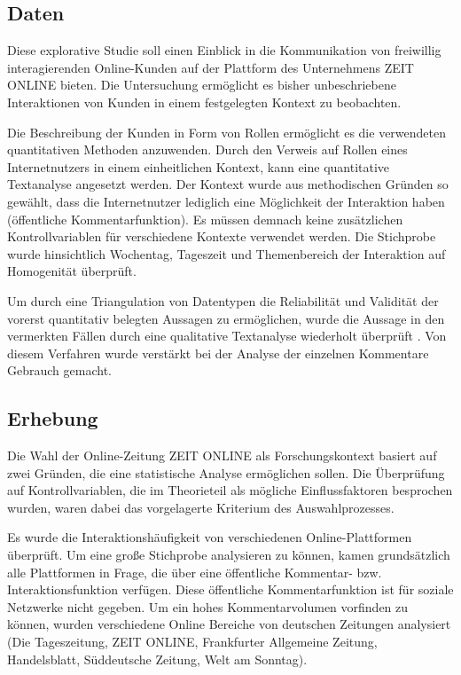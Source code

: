 \documentclass[12pt,a4paper,oneside]{article}
\begin{document}
\begin{titlepage}
\begin{flushleft}
\newpage
\section{Daten}
Diese explorative Studie soll einen Einblick in die Kommunikation von freiwillig interagierenden Online-Kunden auf der Plattform des Unternehmens ZEIT ONLINE bieten. Die Untersuchung ermöglicht es bisher unbe\-schriebene Interaktionen von Kunden in einem festgelegten Kontext zu beobachten.

Die Beschreibung der Kunden in Form von Rollen ermöglicht es die verwendeten quantitativen Methoden anzuwenden. Durch den Verweis auf Rollen eines Internetnutzers in einem einheitlichen Kontext, kann eine quantitative Textanalyse angesetzt werden. Der Kontext wurde aus methodischen Gründen so gewählt, dass die Internetnutzer lediglich eine Möglichkeit der Interaktion haben (öffentliche Kommentarfunktion). Es müssen demnach keine zusätzlichen Kontrollvariablen für verschiedene Kontexte verwendet werden. Die Stichprobe wurde hinsichtlich Wochentag, Tageszeit und Themenbereich der Interaktion auf Homogenität überprüft.

Um durch eine Triangulation von Datentypen die Reliabilität und Validität der vorerst quantitativ belegten Aussagen zu ermöglichen, wurde die Aussage in den vermerkten Fällen durch eine qualitative Textanalyse  wiederholt über\-prüft \cite{eisenhardt1989building,yin2009case}. Von diesem Verfahren wurde verstärkt bei der Analyse der einzelnen Kommentare Gebrauch gemacht.

\subsection{Erhebung}
Die Wahl der Online-Zeitung ZEIT ONLINE als Forschungskontext basiert auf zwei Gründen, die eine statistische Analyse ermöglichen sollen. Die Über\-prüfung auf Kontrollvariablen, die im Theorieteil als mögliche Einflussfaktoren besprochen wurden, waren dabei das vorgelagerte Kriterium des Auswahlprozesses.

Es wurde die Interaktionshäufigkeit von verschiedenen Online-\-Platt\-for\-men überprüft. Um eine große Stichprobe analysieren zu können, kamen grundsätzlich alle Plattformen in Frage, die über eine öffentliche Kommentar- bzw. Interaktionsfunktion verfügen. Diese öffentliche Kommentarfunktion ist für soziale Netzwerke nicht gegeben. Um ein hohes Kommentarvolumen vorfinden zu können, wurden verschiedene Online Bereiche von deutschen Zeitungen analysiert (Die Tageszeitung, ZEIT ONLINE, Frankfurter Allgemeine Zeitung, Handelsblatt, Süddeutsche Zeitung, Welt am Sonntag).


\end{flushleft}
\end{titlepage}
\end{document}
